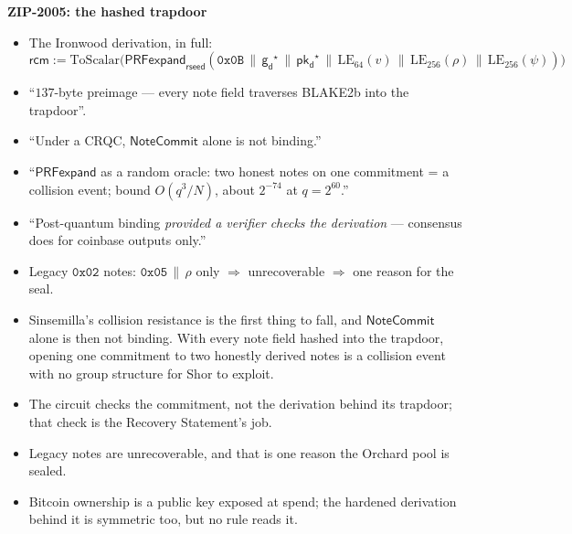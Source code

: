 \documentclass[11pt]{article}
\newcommand{\gd}{\ensuremath{\mathsf{g_d}}}
\newcommand{\pkd}{\ensuremath{\mathsf{pk_d}}}
\newcommand{\rcm}{\ensuremath{\mathsf{rcm}}}
\newcommand{\NoteCommit}{\ensuremath{\mathsf{NoteCommit}}}
\newcounter{board}
\newenvironment{board}[2]{\clearpage\stepcounter{board}%
  \sbox{\bdlabel}{\small\color{arbdim}#2}%
  \noindent\parbox[b]{\dimexpr\textwidth-\wd\bdlabel-1em\relax}{\raggedright
    \color{arb}\large\bfseries #1}\hfill\usebox{\bdlabel}\par
  \vspace{2pt}{\color{arb!40}\hrule}\vspace{4pt}}{\par}
\newcommand{\shead}[1]{\par\smallskip{\small\bfseries\color{arbdim}#1}\par\nopagebreak}
\newcommand{\Write}{\shead{Write}}
\newcommand{\Say}{\shead{Say}}
\begin{document}
\begin{board}{ZIP-2005: the hashed trapdoor}{exists}
\Write
\begin{itemize}
  \item The Ironwood derivation, in full:
    \[
    \rcm := \mathrm{ToScalar}\bigl(\mathsf{PRFexpand}_{\mathsf{rseed}}(
    \mathtt{0x0B} \,\|\, \gd^\star \,\|\, \pkd^\star \,\|\,
    \mathrm{LE}_{64}(v) \,\|\, \mathrm{LE}_{256}(\rho) \,\|\,
    \mathrm{LE}_{256}(\psi))\bigr)
    \]
  \item ``$137$-byte preimage --- every note field traverses BLAKE2b
    into the trapdoor''.
  \item ``Under a CRQC, \NoteCommit{} alone is not binding.''
  \item ``$\mathsf{PRFexpand}$ as a random oracle: two honest notes on
    one commitment = a collision event; bound $O(q^3/N)$, about
    $2^{-74}$ at $q = 2^{60}$.''
  \item ``Post-quantum binding \emph{provided a verifier checks the
    derivation} --- consensus does for coinbase outputs only.''
  \item Legacy $\mathtt{0x02}$ notes: $\mathtt{0x05} \,\|\, \rho$ only
    $\Rightarrow$ unrecoverable $\Rightarrow$ one reason for the seal.
\end{itemize}
\newpage
\Say
\begin{itemize}
  \item Sinsemilla's collision resistance is the first thing to fall,
    and \NoteCommit{} alone is then not binding. With every note field
    hashed into the trapdoor, opening one commitment to two honestly
    derived notes is a collision event with no group structure for Shor
    to exploit.
  \item The circuit checks the commitment, not the derivation behind
    its trapdoor; that check is the Recovery Statement's job.
  \item Legacy notes are unrecoverable, and that is one reason the
    Orchard pool is sealed.
  \item Bitcoin ownership is a public key exposed at spend; the hardened
    derivation behind it is symmetric too, but no rule reads it.
\end{itemize}
\end{board}
\end{document}
